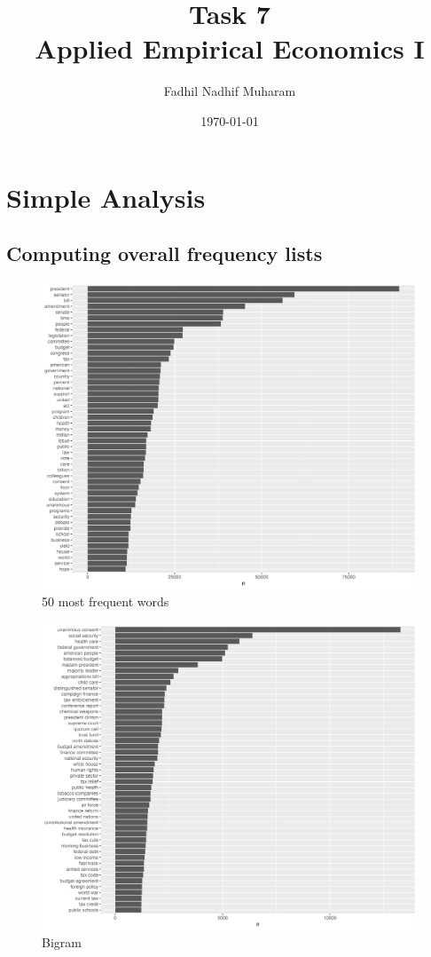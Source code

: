 \documentclass[10pt,leqno]{article}
\title{Task 7\\
Applied Empirical Economics I}
\author{Fadhil Nadhif Muharam}
\date{\today}
\begin{document}
\maketitle

\section{Simple Analysis}

\subsection{Computing overall frequency lists}
\begin{figure}  [h!]
\begin{center}
\caption{50 most frequent words}
\includegraphics[scale=0.4]{3a_word_freq.png}
\end{center}
\end{figure}  

\begin{figure}  [h!]
\begin{center}
\caption{Bigram}
\includegraphics[scale=0.4]{3a_bigram_freq.png}
\end{center}
\end{figure}  
\end{document}
